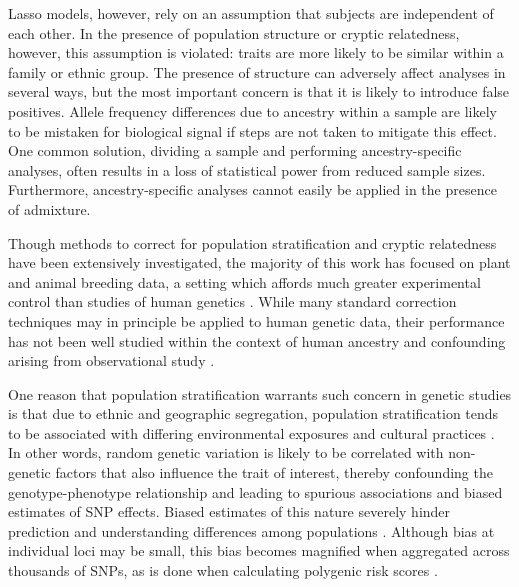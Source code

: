 Lasso models, however, rely on an assumption that subjects are independent of each other. In the presence of population structure or cryptic relatedness, however, this assumption is violated: traits are more likely to be similar within a family or ethnic group. The presence of structure can adversely affect analyses in several ways, but the most important concern is that it is likely to introduce false positives. Allele frequency differences due to ancestry within a sample are likely to be mistaken for biological signal if steps are not taken to mitigate this effect. One common solution, dividing a sample and performing ancestry-specific analyses, often results in a loss of statistical power from reduced sample sizes. Furthermore, ancestry-specific analyses cannot easily be applied in the presence of admixture.

Though methods to correct for population stratification and cryptic relatedness have been extensively investigated, the majority of this work has focused on plant and animal breeding data, a setting which affords much greater experimental control than studies of human genetics \citep{Amin2007, hoffman2013correcting, price2006principal, rakitsch2013lasso, bhatnagar2020simultaneous, Sillanpaeae2011}. While many standard correction techniques may in principle be applied to human genetic data, their performance has not been well studied within the context of human ancestry and confounding arising from observational study \citep{lawson2019population, barton2019population}.

One reason that population stratification warrants such concern in genetic studies is that due to ethnic and geographic segregation, population stratification tends to be associated with differing environmental exposures and cultural practices \citep{thornton2015statistical, browning2011population}. In other words, random genetic variation is likely to be correlated with non-genetic factors that also influence the trait of interest, thereby confounding the genotype-phenotype relationship and leading to spurious associations and biased estimates of SNP effects. Biased estimates of this nature severely hinder prediction and understanding differences among populations \citep{barton2019population}. Although bias at individual loci may be small, this bias becomes magnified when aggregated across thousands of SNPs, as is done when calculating polygenic risk scores \citep{barton2019population, peterson2019genome}.

